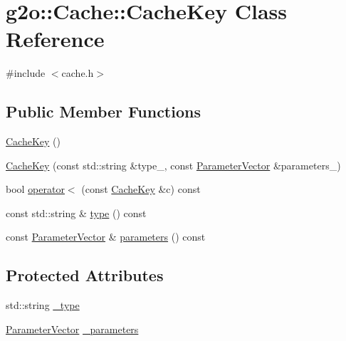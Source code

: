 \hypertarget{classg2o_1_1_cache_1_1_cache_key}{}\section{g2o\+:\+:Cache\+:\+:Cache\+Key Class Reference}
\label{classg2o_1_1_cache_1_1_cache_key}


{\ttfamily \#include $<$cache.\+h$>$}

\subsection*{Public Member Functions}
\begin{DoxyCompactItemize}
\item 
\mbox{\hyperlink{classg2o_1_1_cache_1_1_cache_key_a44405e660e962a9d39cfaf97f103b139}{Cache\+Key}} ()
\item 
\mbox{\hyperlink{classg2o_1_1_cache_1_1_cache_key_a363ba06fe3b3f17acd664b0706ba3270}{Cache\+Key}} (const std\+::string \&type\+\_\+, const \mbox{\hyperlink{namespaceg2o_a85cc8f2c7db8cab47b2b269a7acd6785}{Parameter\+Vector}} \&parameters\+\_\+)
\item 
bool \mbox{\hyperlink{classg2o_1_1_cache_1_1_cache_key_a37ebfaa23730d98c642191fc5e360901}{operator$<$}} (const \mbox{\hyperlink{classg2o_1_1_cache_1_1_cache_key}{Cache\+Key}} \&c) const
\item 
const std\+::string \& \mbox{\hyperlink{classg2o_1_1_cache_1_1_cache_key_a426acdbf2c72f48f7923dcd7e2137aef}{type}} () const
\item 
const \mbox{\hyperlink{namespaceg2o_a85cc8f2c7db8cab47b2b269a7acd6785}{Parameter\+Vector}} \& \mbox{\hyperlink{classg2o_1_1_cache_1_1_cache_key_a06153e97f21620b5b74f6d3566171853}{parameters}} () const
\end{DoxyCompactItemize}
\subsection*{Protected Attributes}
\begin{DoxyCompactItemize}
\item 
std\+::string \mbox{\hyperlink{classg2o_1_1_cache_1_1_cache_key_a886ec6cf583561cb791cbaff902c673d}{\+\_\+type}}
\item 
\mbox{\hyperlink{namespaceg2o_a85cc8f2c7db8cab47b2b269a7acd6785}{Parameter\+Vector}} \mbox{\hyperlink{classg2o_1_1_cache_1_1_cache_key_a3f8dc2307bd1d174a30bdc8443a8d152}{\+\_\+parameters}}
\end{DoxyCompactItemize}
